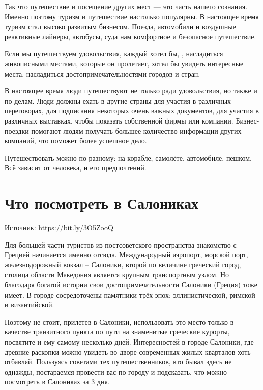 Так что путешествие и посещение других мест --- это часть нашего сознания. Именно поэтому туризм и путешествие настолько популярны. В настоящее время туризм стал высоко развитым бизнесом. Поезда, автомобили и воздушные реактивные лайнеры, автобусы, суда  нам комфортное и безопасное путешествие.

Если мы путешествуем  удовольствия, каждый хотел бы, , насладиться живописными местами, которые он пролетает, хотел бы увидеть интересные места, насладиться достопримечательностями городов и стран.

В настоящее время люди путешествуют не только ради удовольствия, но также и по делам. Люди должны ехать в другие страны для участия в различных переговорах, для подписания некоторых очень важных документов, для участия в различных выставках, чтобы показать  собственной фирмы или компании. Бизнес-поездки помогают людям получать большее количество информации   других компаний, что поможет  более успешное дело.

Путешествовать можно по-разному: на корабле, самолёте, автомобиле, пешком. Всё зависит от человека, и его предпочтений.


\section{Что посмотреть в Салониках}
Источник: \url{https://bit.ly/3O5ZooQ}

Для большей части туристов из постсоветского пространства знакомство с Грецией начинается именно отсюда. Международный аэропорт, морской порт, железнодорожный вокзал – Салоники, второй по величине греческий город, столица области Македония является крупным транспортным узлом. Но благодаря богатой истории свои достопримечательности Салоники (Греция) тоже имеет. В городе сосредоточены памятники трёх эпох: эллинистической, римской и византийской.

Поэтому не стоит, прилетев в Салоники, использовать это место только в качестве транзитного пункта по пути на знаменитые греческие курорты, посвятите и ему самому несколько дней. Интересностей в городе Салоники, где древние раскопки можно увидеть во дворе современных жилых кварталов хоть отбавляй. Пользуясь советами тех путешественников, кто бывал здесь не однажды, постараемся провести вас по городу и подсказать, что можно посмотреть в Салониках за 3 дня.


